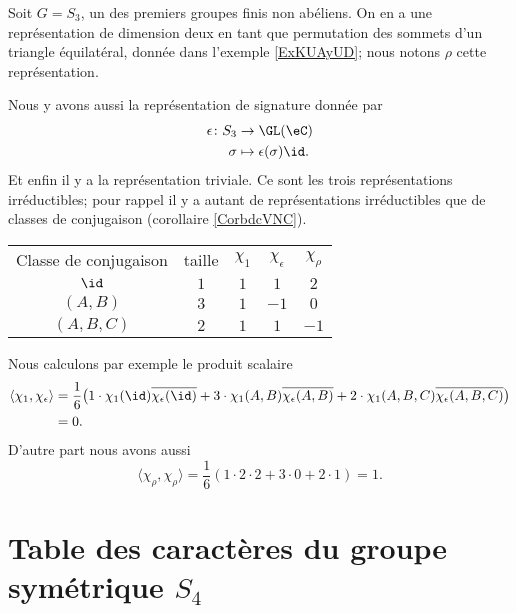 Soit \( G=S_3\), un des premiers groupes finis non abéliens. On en a une représentation de dimension deux en tant que permutation des sommets d'un triangle équilatéral, donnée dans l'exemple \ref{ExKUAyUD}; nous notons \( \rho\) cette représentation.

Nous y avons aussi la représentation de signature donnée par
\begin{equation}
    \begin{aligned}
        \epsilon\colon S_3&\to \GL(\eC) \\
        \sigma&\mapsto \epsilon(\sigma)\id. 
    \end{aligned}
\end{equation}
Et enfin il y a la représentation triviale. Ce sont les trois représentations irréductibles; pour rappel il y a autant de représentations irréductibles que de classes de conjugaison (corollaire \ref{CorbdcVNC}).

\begin{tabular}[]{ccccc}
    Classe de conjugaison   &   taille  &   \( \chi_1\) &   \( \chi_{\epsilon}\)    &   $\chi_{\rho}$\\
     $\id$   &   $1$    &   $1$    &   $1$    &   $2$    \\
     \( (A,B)\)   &   $3$    &   $1$    &   $-1$    &   $0$    \\
     \( (A,B,C)\)   &   \( 2\)    &   \( 1\)    &   \( 1\)    &   $-1$    \\
\end{tabular}

Nous calculons par exemple le produit scalaire
\begin{subequations}
    \begin{align}
        \langle \chi_1, \chi_{\epsilon}\rangle &=\frac{1}{ 6 }\big( 1\cdot\chi_1(\id)\overline{ \chi_{\epsilon}(\id) }+3\cdot \chi_1(A,B)\overline{ \chi_{\epsilon}(A,B) }+2\cdot \chi_1(A,B,C)\overline{ \chi_{\epsilon}(A,B,C) } \big)\\
        &=0.
    \end{align}
\end{subequations}
D'autre part nous avons aussi
\begin{equation}
    \langle \chi_{\rho}, \chi_{\rho}\rangle =\frac{1}{ 6 }(1\cdot2\cdot 2+3\cdot 0+2\cdot 1)=1.
\end{equation}

\section{Table des caractères du groupe symétrique \texorpdfstring{$ S_4$}{S4}}
\label{SecUMIgTmO}

